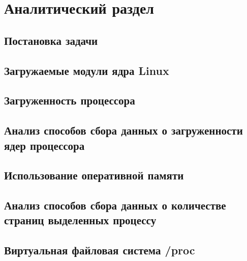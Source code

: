 \chapter{Аналитический раздел}

\section{Постановка задачи}

\section{Загружаемые модули ядра Linux}

\section{Загруженность процессора}

\section{Анализ способов сбора данных о загруженности ядер процессора}

\section{Использование оперативной памяти}

\section{Анализ способов сбора данных о количестве страниц выделенных процессу}

\section{Виртуальная файловая система /proc}